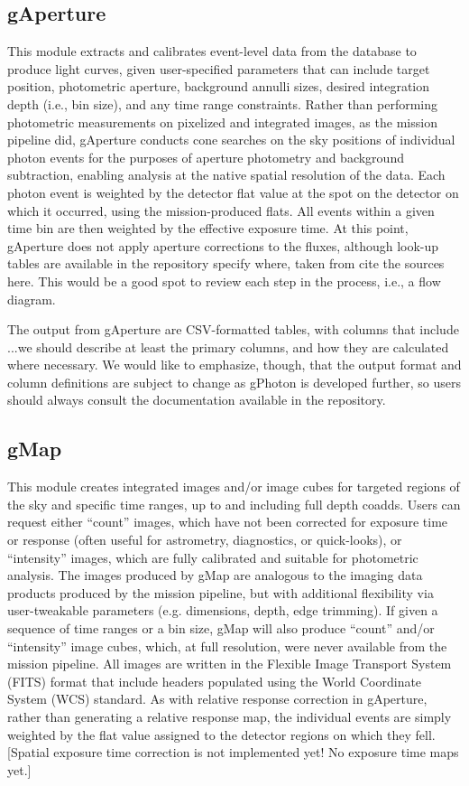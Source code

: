 \documentclass[5p]{elsarticle}
\begin{document}
\subsection{gAperture}
This module extracts and calibrates event-level data from the database to produce light curves, given user-specified parameters that can include target position, photometric aperture, background annulli sizes, desired integration depth (i.e., bin size), and any time range constraints. Rather than performing photometric measurements on pixelized and integrated images, as the mission pipeline did, gAperture conducts cone searches on the sky positions of individual photon events for the purposes of aperture photometry and background subtraction, enabling analysis at the native spatial resolution of the data. Each photon event is weighted by the detector flat value at the spot on the detector on which it occurred, using the mission-produced flats. All events within a given time bin are then weighted by the effective exposure time.  At this point, gAperture does not apply aperture corrections to the fluxes, although look-up tables are available in the repository {\color{red}specify where}, taken from {\color{red}cite the sources here.}  {\color{red}This would be a good spot to review each step in the process, i.e., a flow diagram.}

The output from gAperture are CSV-formatted tables, with columns that include {\color{red}...we should describe at least the primary columns, and how they are calculated where necessary.}  We would like to emphasize, though, that the output format and column definitions are subject to change as gPhoton is developed further, so users should always consult the documentation available in the repository.

\subsection{gMap}
This module creates integrated images and/or image cubes for targeted regions of the sky and specific time ranges, up to and including full depth coadds. Users can request either ``count'' images, which have not been corrected for exposure time or response (often useful for astrometry, diagnostics, or quick-looks), or ``intensity'' images, which are fully calibrated and suitable for photometric analysis. The images produced by gMap are analogous to the imaging data products produced by the mission pipeline, but with additional flexibility via user-tweakable parameters (e.g. dimensions, depth, edge trimming). If given a sequence of time ranges or a bin size, gMap will also produce ``count'' and/or ``intensity'' image cubes, which, at full resolution, were never available from the mission pipeline. All images are written in the Flexible Image Transport System (FITS) format that include headers populated using the World Coordinate System (WCS) standard.  As with relative response correction in gAperture, rather than generating a relative response map, the individual events are simply weighted by the flat value assigned to the detector regions on which they fell. {\color{red}[Spatial exposure time correction is not implemented yet!  No exposure time maps yet.]}
\end{document}
